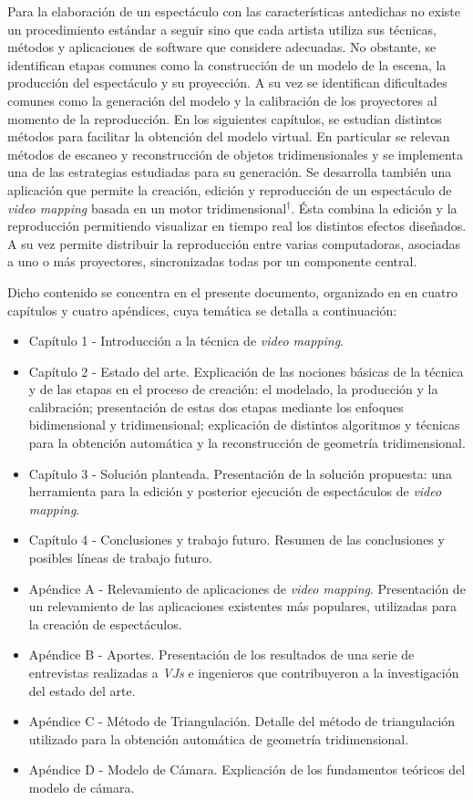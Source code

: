 Para la elaboración de un espectáculo con las características antedichas no existe un procedimiento estándar a seguir sino que cada artista utiliza sus técnicas, métodos y aplicaciones de software que considere adecuadas. No obstante, se identifican etapas comunes como la construcción de un modelo de la escena, la producción del espectáculo y su proyección. A su vez se identifican dificultades comunes como la generación del modelo y la calibración de los proyectores al momento de la reproducción.
En los siguientes capítulos, se estudian distintos métodos para facilitar la obtención del modelo virtual. En particular se relevan métodos de escaneo y reconstrucción de objetos tridimensionales y se implementa una de las estrategias estudiadas para su generación.
Se desarrolla también una aplicación que permite la creación, edición y reproducción de un espectáculo de \emph{video mapping} basada en un motor tridimensional$^\dagger$. Ésta combina la edición y la reproducción permitiendo visualizar en tiempo real los distintos efectos diseñados. A su vez permite distribuir la reproducción entre varias computadoras, asociadas a uno o más proyectores, sincronizadas todas por un componente central.

Dicho contenido se concentra en el presente documento, organizado en en cuatro capítulos y cuatro apéndices, cuya temática se detalla a continuación:
\begin{itemize}
\item Capítulo 1 - Introducción a la técnica de \emph{video mapping}.
\item Capítulo 2 - Estado del arte. Explicación de las nociones básicas de la técnica y de las etapas en el proceso de creación: el modelado, la producción y la calibración; presentación de estas dos etapas mediante los enfoques bidimensional y tridimensional; explicación de distintos algoritmos y técnicas para la obtención automática y la reconstrucción de geometría tridimensional.
\item Capítulo 3 - Solución planteada. Presentación de la solución propuesta: una herramienta para la edición y posterior ejecución de espectáculos de \emph{video mapping}.
\item Capítulo 4 - Conclusiones y trabajo futuro. Resumen de las conclusiones y posibles líneas de trabajo futuro.
\item Apéndice A - Relevamiento de aplicaciones de \emph{video mapping}. Presentación de un relevamiento de las aplicaciones existentes más populares, utilizadas para la creación de espectáculos.
\item Apéndice B - Aportes. Presentación de los resultados de una serie de entrevistas realizadas a  \emph{VJs} e ingenieros que contribuyeron a la investigación del estado del arte.
\item Apéndice C - Método de Triangulación. Detalle del método de triangulación utilizado para la obtención automática de geometría tridimensional.
\item Apéndice D - Modelo de Cámara. Explicación de los fundamentos teóricos del modelo de cámara.
\end{itemize}